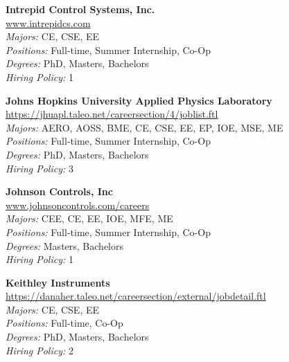 \documentclass{article}
\begin{document}
\begin{center}
\begin{multicols}{3}
\begin{minipage}{.9\columnwidth}{\Large\bf Intrepid Control Systems, Inc. }\\
	\url{www.intrepidcs.com}\\
	\emph{Majors:} CE, CSE, EE\\
	\emph{Positions:} Full-time, Summer Internship, Co-Op\\
	\emph{Degrees:} PhD, Masters, Bachelors\\
	\emph{Hiring Policy:} 1\\
\end{minipage}
 
\begin{minipage}{.9\columnwidth}{\Large\bf Johns Hopkins University Applied Physics Laboratory }\\
	\url{https://jhuapl.taleo.net/careersection/4/joblist.ftl}\\
	\emph{Majors:} AERO, AOSS, BME, CE, CSE, EE, EP, IOE, MSE, ME\\
	\emph{Positions:} Full-time, Summer Internship, Co-Op\\
	\emph{Degrees:} PhD, Masters, Bachelors\\
	\emph{Hiring Policy:} 3\\
\end{minipage}
 
\begin{minipage}{.9\columnwidth}{\Large\bf Johnson Controls, Inc }\\
	\url{www.johnsoncontrols.com/careers}\\
	\emph{Majors:} CEE, CE, EE, IOE, MFE, ME\\
	\emph{Positions:} Full-time, Summer Internship, Co-Op\\
	\emph{Degrees:} Masters, Bachelors\\
	\emph{Hiring Policy:} 1\\
\end{minipage}
 
\begin{minipage}{.9\columnwidth}{\Large\bf Keithley Instruments }\\
	\url{https://danaher.taleo.net/careersection/external/jobdetail.ftl}\\
	\emph{Majors:} CE, CSE, EE\\
	\emph{Positions:} Full-time, Co-Op\\
	\emph{Degrees:} PhD, Masters, Bachelors\\
	\emph{Hiring Policy:} 2\\
\end{minipage}
 

\end{multicols}
\end{center}
\end{document}
